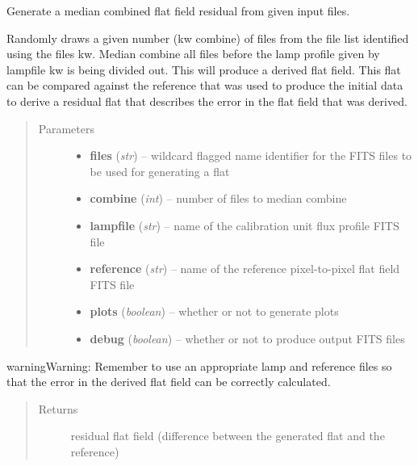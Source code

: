 \documentclass[a4paper,12pt,english]{sphinxmanual}
\begin{document}
\begin{fulllineitems}
\label{reduction:analysis.FlatfieldCalibration.generateResidualFlatField}
Generate a median combined flat field residual from given input files.

Randomly draws a given number (kw combine) of files from the file list identified using the files kw.
Median combine all files before the lamp profile given by lampfile kw is being divided out. This
will produce a derived flat field. This flat can be compared against the reference that was used
to produce the initial data to derive a residual flat that describes the error in the flat field
that was derived.
\begin{quote}\begin{description}
\item[{Parameters}] \leavevmode\begin{itemize}
\item {} 
\textbf{files} (\emph{str}) -- wildcard flagged name identifier for the FITS files to be used for generating a flat

\item {} 
\textbf{combine} (\emph{int}) -- number of files to median combine

\item {} 
\textbf{lampfile} (\emph{str}) -- name of the calibration unit flux profile FITS file

\item {} 
\textbf{reference} (\emph{str}) -- name of the reference pixel-to-pixel flat field FITS file

\item {} 
\textbf{plots} (\emph{boolean}) -- whether or not to generate plots

\item {} 
\textbf{debug} (\emph{boolean}) -- whether or not to produce output FITS files

\end{itemize}

\end{description}\end{quote}

\begin{notice}{warning}{Warning:}
Remember to use an appropriate lamp and reference files so that the error in the derived
flat field can be correctly calculated.
\end{notice}
\begin{quote}\begin{description}
\item[{Returns}] \leavevmode
residual flat field (difference between the generated flat and the reference)


\end{description}
\end{quote}
\end{fulllineitems}
\end{document}
